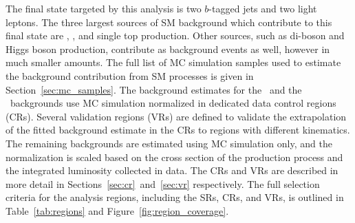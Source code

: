 The final state targeted by this analysis is two $b$-tagged jets and two light
leptons.
The three largest sources of SM background which contribute to this final state
are \TTBAR, \ZGAMMAJETS, and single top production.
Other sources, such as di-boson and Higgs boson production, contribute as
background events as well, however in much smaller amounts.
The full list of MC simulation samples used to estimate the background
contribution from SM processes is given in Section~\ref{sec:mc_samples}.
The background estimates for the \TTBAR\ and the \ZGAMMAJETS\ backgrounds use
MC simulation normalized in dedicated data control regions (CRs).
Several validation regions (VRs) are defined to validate the extrapolation of
the fitted background estimate in the CRs to regions with different kinematics.
The remaining backgrounds are estimated using MC simulation only, and the
normalization is scaled based on the cross section of the production process and
the integrated luminosity collected in data.
The CRs and VRs are described in more detail in
Sections~\ref{sec:cr}~and~\ref{sec:vr} respectively.
The full selection criteria for the analysis regions, including the SRs, CRs,
and VRs, is outlined in Table~\ref{tab:regions} and
Figure~\ref{fig:region_coverage}.

\begin{table}[ht]
  \caption{Summary of signal, control, and validation regions used for this
    analysis.
    The control and validation regions are explained in Section~\ref{sec:bkg}.
    All regions require two $b$-tagged jets and two oppositely charged leptons.
    An event is in the $Z$ window if it contains two same-flavored leptons with
    an invariant mass within 10~\GeV\ of the mass of the $Z$ boson.
  }
  \label{tab:regions}
\end{table}

